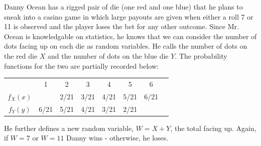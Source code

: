 \documentclass[addpoints]{examsetup}\usepackage[]{graphicx}\usepackage[]{color}
\begin{document}
\begin{questions}

\newpage

\question 

Danny Ocean has a rigged pair of die (one red and one blue) that he plans to sneak into a casino game in which large payouts are given when either a roll 7 or 11 is observed and the player loses the bet for any other outcome. 
Since Mr. Ocean is knowledgable on statistics, he knows that we can consider the number of dots facing up on each die as random variables.
He calls the number of dots on the red die $X$ and the number of dots on the blue die $Y$.
The probability functions for the two are partially recorded below:






\begin{table}[h]
   \centering
   \begin{tabular}{cccccccc}
      & 1 & 2 & 3 & 4 & 5 & 6 \\
      $f_{X}(x)$ &               & 2/21 & 3/21 & 4/21 & 5/21 & 6/21 \\
      $f_{Y}(y)$ & 6/21 & 5/21 & 4/21 & 3/21 & 2/21 &               \\
   \end{tabular}
\end{table}

He further defines a new random variable, $W = X + Y$, the total facing up. Again, if $W = 7$ or $W = 11$ Danny wins - otherwise, he loses.


\end{questions}
\end{document}
